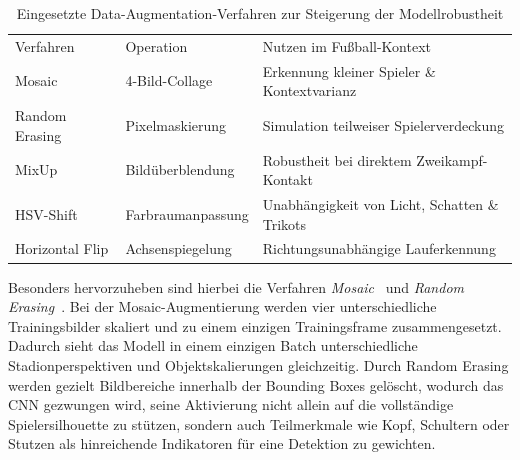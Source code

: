 \begin{table}[htbp]
    \centering
    \caption{Eingesetzte Data-Augmentation-Verfahren zur Steigerung der Modellrobustheit}\label{tab:augmentation-methoden}
    \begin{tabularx}{\linewidth}{llX}
        \tabkopf{}
        Verfahren & Operation & Nutzen im Fußball-Kontext \\
        Mosaic~\cite{bochkovskiy2020yolov4} & 4-Bild-Collage & Erkennung kleiner Spieler \& Kontextvarianz \\
        Random Erasing~\cite{zhong2020random} & Pixelmaskierung & Simulation teilweiser Spielerverdeckung \\
        MixUp & Bildüberblendung & Robustheit bei direktem Zweikampf-Kontakt \\
        HSV-Shift & Farbraumanpassung & Unabhängigkeit von Licht, Schatten \& Trikots \\
        Horizontal Flip & Achsenspiegelung & Richtungsunabhängige Lauferkennung \\
    \end{tabularx}
\end{table}

Besonders hervorzuheben sind hierbei die Verfahren \textit{Mosaic}~\cite{bochkovskiy2020yolov4} und 
\textit{Random Erasing}~\cite{zhong2020random}. Bei der Mosaic-Augmentierung werden vier unterschiedliche 
Trainingsbilder skaliert und zu einem einzigen Trainingsframe zusammengesetzt. Dadurch sieht das Modell 
in einem einzigen Batch unterschiedliche Stadionperspektiven und Objektskalierungen gleichzeitig. Durch 
Random Erasing werden gezielt Bildbereiche innerhalb der Bounding Boxes gelöscht, wodurch das \ac{CNN} 
gezwungen wird, seine Aktivierung nicht allein auf die vollständige Spielersilhouette zu stützen, sondern 
auch Teilmerkmale wie Kopf, Schultern oder Stutzen als hinreichende Indikatoren für eine Detektion zu 
gewichten.